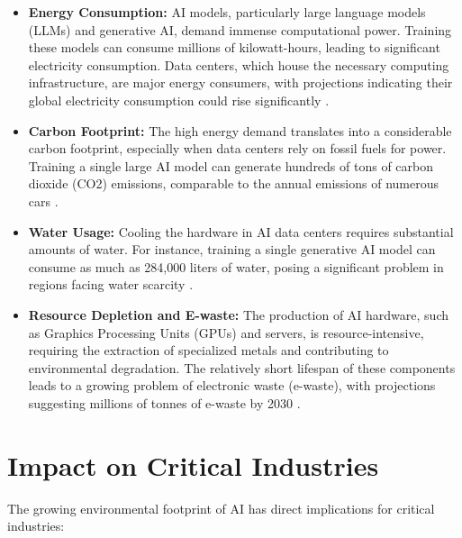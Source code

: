\begin{itemize}
    \item \textbf{Energy Consumption:} AI models, particularly large language models (LLMs) and generative AI, demand immense computational power. Training these models can consume millions of kilowatt-hours, leading to significant electricity consumption. Data centers, which house the necessary computing infrastructure, are major energy consumers, with projections indicating their global electricity consumption could rise significantly \parencite{IEA2025}.
    \item \textbf{Carbon Footprint:} The high energy demand translates into a considerable carbon footprint, especially when data centers rely on fossil fuels for power. Training a single large AI model can generate hundreds of tons of carbon dioxide (CO2) emissions, comparable to the annual emissions of numerous cars \parencite{ColumbiaEdu2023}.
    \item \textbf{Water Usage:} Cooling the hardware in AI data centers requires substantial amounts of water. For instance, training a single generative AI model can consume as much as 284,000 liters of water, posing a significant problem in regions facing water scarcity \parencite{Li2023}.
    \item \textbf{Resource Depletion and E-waste:} The production of AI hardware, such as Graphics Processing Units (GPUs) and servers, is resource-intensive, requiring the extraction of specialized metals and contributing to environmental degradation. The relatively short lifespan of these components leads to a growing problem of electronic waste (e-waste), with projections suggesting millions of tonnes of e-waste by 2030 \parencite{Wang2024}.
\end{itemize}

\section{Impact on Critical Industries}
\label{sec:sustainability_impact}
The growing environmental footprint of AI has direct implications for critical industries:

